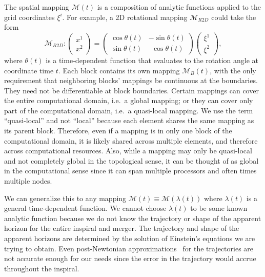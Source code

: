 \begin{bibunit}[unsrtnat]
The spatial mapping $\mathcal{M}(t)$ is a composition of analytic functions
applied to the grid coordinates $\xi^{i}$. For example, a 2D rotational mapping
$\mathcal{M}_{R2D}$ could take the form
\begin{equation}
  \mathcal{M}_{R2D} :
  \begin{pmatrix}
    x^{1} \\
    x^{2}
  \end{pmatrix}
  =
  \begin{pmatrix}
   \cos\theta(t) & -\sin\theta(t) \\
   \sin\theta(t) &~~\cos\theta(t)
  \end{pmatrix}
  \begin{pmatrix}
    \xi^{1} \\
    \xi^{2}
  \end{pmatrix},
\end{equation}
where $\theta(t)$ is a time-dependent function that evaluates to the rotation
angle at coordinate time $t$. Each block contains its own mapping
$\mathcal{M}_{B}(t)$, with the only requirement that neighboring blocks'
mappings be continuous at the boundaries. They need not be differentiable at
block boundaries. Certain mappings can cover the entire computational domain,
i.e.~a global mapping; or they can cover only part of the computational domain,
i.e.~a quasi-local mapping. We use the term ``quasi-local'' and not ``local''
because each element shares the same mapping as its parent block. Therefore,
even if a mapping is in only one block of the computational domain, it is likely
shared across multiple elements, and therefore across computational resources.
Also, while a mapping may only be quasi-local and not completely global in the
topological sense, it can be thought of as global in the computational sense
since it can span multiple processors and often times multiple nodes.

We can generalize this to any mapping $\mathcal{M}(t) \equiv
\mathcal{M}(\lambda(t))$ where $\lambda(t)$ is a general time-dependent
function. We cannot choose $\lambda(t)$ to be some known analytic function
because we do not know the trajectory or shape of the apparent horizon for the
entire inspiral and merger. The trajectory and shape of the apparent horizons
are determined by the solution of Einstein's equations we are trying to obtain.
Even post-Newtonian approximations~\cite{Blanchet:2024mnz} for the trajectories
are not accurate enough for our needs since the error in the trajectory would
accrue throughout the inspiral.


\end{bibunit}
